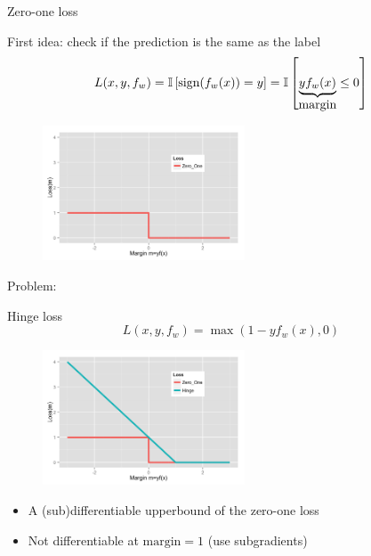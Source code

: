 \documentclass[usenames,dvipsnames,notes,11pt,aspectratio=169]{beamer}
\begin{document}
\begin{frame}
    {Zero-one loss}
    
    First idea: check if the prediction is the same as the label
    \vspace{-1em}
            \begin{align}
                L(x, y, f_w) = \mathbb{I}\left[ \text{sign}(f_w(x)) = y \right] 
                = \mathbb{I}\left[ \underbrace{yf_w(x)}_{\textstyle\text{margin}}\le 0 \right]
            \end{align}
    \begin{figure}
        \includegraphics[height=4cm]{figures/loss.Zero_One.png}
    \end{figure}
    \pause
    Problem: 
\end{frame}

\begin{frame}
    {Hinge loss}
    $$
    L(x,y,f_w) = \max(1-yf_w(x), 0)
    $$
    \begin{figure}
        \includegraphics[height=4cm]{figures/loss.Zero_One.Hinge.png}
    \end{figure}
    \begin{itemize}
        \item A (sub)differentiable upperbound of the zero-one loss
        \item Not differentiable at $\text{margin}=1$ (use subgradients)
    \end{itemize}
\end{frame}
\end{document}
